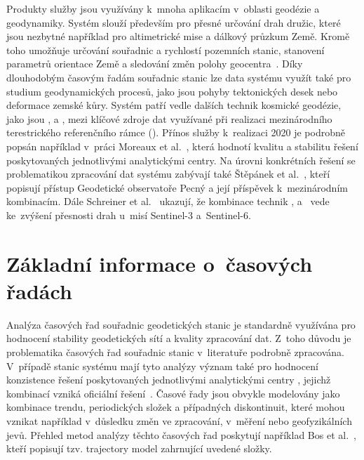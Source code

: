 Produkty služby  jsou využívány k~mnoha aplikacím v~oblasti geodézie a \mbox{geodynamiky}. Systém  slouží především pro přesné určování drah družic, které jsou nezbytné například pro altimetrické mise a dálkový průzkum Země. Kromě toho umožňuje určování souřadnic a rychlostí pozemních stanic, stanovení parametrů orientace Země a sledování změn polohy geocentra~\cite{moreaux_2023_itrf2020}. Díky dlouhodobým časovým řadám souřadnic stanic lze data systému  využít také pro studium geodynamických procesů, jako jsou pohyby tektonických desek nebo deformace zemské kůry. Systém  patří vedle dalších technik kosmické geodézie, jako jsou ,  a , mezi klíčové zdroje dat využívané při realizaci \mbox{mezinárodního} terestrického referenčního rámce (). Přínos služby  k~realizaci 2020 je podrobně popsán například v~práci Moreaux et al.~\cite{moreaux_2023_itrf2020}, která hodnotí kvalitu a stabilitu řešení poskytovaných jednotlivými analytickými centry. Na úrovni konkrétních řešení se problematikou zpracování dat systému  zabývají také Štěpánek et al.~\cite{stepanek_2023_gop_itrf2020,stepanek_2006_doris_data_analysis}, kteří popisují přístup Geodetické observatoře Pecný a její příspěvek k~mezinárodním kombinacím. Dále Schreiner et al.~\cite{schreiner_2023_pod_doris_gps_slr} ukazují, že kombinace technik ,  a~ vede ke~zvýšení přesnosti drah u~misí Sentinel-3 a~Sentinel-6.

\section{Základní informace o~časových řadách}

Analýza časových řad souřadnic geodetických stanic je standardně využívána pro hodnocení stability geodetických sítí a kvality zpracování dat. Z~toho důvodu je problematika časových řad souřadnic stanic v~literatuře podrobně zpracována. V~případě stanic systému  mají tyto analýzy význam také pro hodnocení konzistence řešení poskytovaných jednotlivými analytickými centry , jejichž kombinací vzniká oficiální řešení~\cite{moreaux_2023_itrf2020}. Časové řady jsou obvykle modelovány jako kombinace trendu, periodických složek a případných diskontinuit, které mohou vznikat například v~důsledku změn ve zpracování, v~měření nebo geofyzikálních jevů. Přehled metod analýzy těchto časových řad poskytují například Bos et al.~\cite{bos_2019_time_series}, kteří popisují tzv. trajectory model zahrnující uvedené složky.

